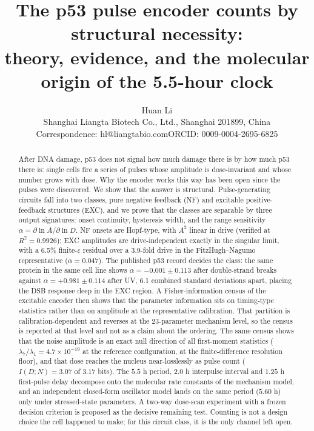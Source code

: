 \documentclass[11pt,a4paper]{article}
\title{\textbf{The p53 pulse encoder counts by structural necessity:\\ theory, evidence, and the molecular origin of the 5.5-hour clock}}
\author{Huan Li\\[2pt]
\small Shanghai Liangta Biotech Co., Ltd., Shanghai 201899, China\\
\small Correspondence: hl@liangtabio.com\quad ORCID: 0009-0004-2695-6825}
\date{}
\begin{document}
\maketitle

\begin{abstract}
\noindent
After DNA damage, p53 does not signal how much damage there is by how much p53 there is: single cells fire a series of pulses whose amplitude is dose-invariant and whose number grows with dose. Why the encoder works this way has been open since the pulses were discovered. We show that the answer is structural. Pulse-generating circuits fall into two classes, pure negative feedback (NF) and excitable positive-feedback structures (EXC), and we prove that the classes are separable by three output signatures: onset continuity, hysteresis width, and the range sensitivity $\alpha=\partial\ln A/\partial\ln D$. NF onsets are Hopf-type, with $A^2$ linear in drive (verified at $R^2=0.9926$); EXC amplitudes are drive-independent exactly in the singular limit, with a 6.5\% finite-$\varepsilon$ residual over a 3.9-fold drive in the FitzHugh--Nagumo representative ($\alpha=0.047$). The published p53 record decides the class: the same protein in the same cell line shows $\alpha=-0.001\pm0.113$ after double-strand breaks against $\alpha=+0.981\pm0.114$ after UV, 6.1 combined standard deviations apart, placing the DSB response deep in the EXC region. A Fisher-information census of the excitable encoder then shows that the parameter information sits on timing-type statistics rather than on amplitude at the representative calibration. That partition is calibration-dependent and reverses at the 23-parameter mechanism level, so the census is reported at that level and not as a claim about the ordering. The same census shows that the noise amplitude is an exact null direction of all first-moment statistics ($\lambda_7/\lambda_1=4.7\times10^{-19}$ at the reference configuration, at the finite-difference resolution floor), and that dose reaches the nucleus near-losslessly as pulse count ($I(D;N)=3.07$ of $3.17$ bits). The $5.5$ h period, $2.0$ h interpulse interval and $1.25$ h first-pulse delay decompose onto the molecular rate constants of the mechanism model, and an independent closed-form oscillator model lands on the same period ($5.60$ h) only under stressed-state parameters. A two-way dose-scan experiment with a frozen decision criterion is proposed as the decisive remaining test. Counting is not a design choice the cell happened to make; for this circuit class, it is the only channel left open.
\end{abstract}
\end{document}
